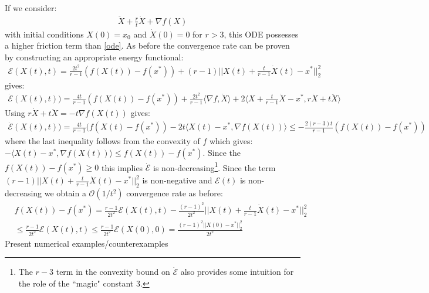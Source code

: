 \documentclass{article}
\begin{document}
If we consider:
\begin{align}
    \ddot{X} + \frac{r}{t} \dot{X} + \nabla f(X) \label{highfrictionode}
\end{align}
with initial conditions $X(0) = x_0$ and $\dot{X}(0) = 0$ for $r>3$, this ODE possesses a higher friction term than \eqref{ode}. As before the convergence rate can be proven by constructing an appropriate energy functional:
\begin{align*}
    \mathcal{E}(X(t), t) = \frac{2t^2}{r-1} \left( f(X(t)) -f(x^*) \right) + (r-1) ||X(t) + \frac{t}{r-1}\dot{X}(t) -x^*||_2^2
\end{align*}
gives:
\begin{align*}
    \dot{\mathcal{E}}(X(t), t)) = \frac{4t}{r-1}(f(X(t)) - f(x^*)) + \frac{2t^2}{r-1} \langle \nabla f, \dot{X} \rangle + 2 \langle X + \frac{t}{r-1} \dot{X} - x^*, r \dot{X} + t \ddot{X} \rangle
\end{align*}
Using $r\dot{X} + t \ddot{X} = -t \nabla f(X(t))$ gives:
\begin{align*}
    \dot{\mathcal{E}}(X(t), t)) = \frac{4t}{r-1} (f(X(t) - f(x^*)) - 2t \langle X(t) - x^*, \nabla f(X(t)) \rangle \leq - \frac{2(r-3)t}{r-1}(f(X(t))-f(x^*))
\end{align*}
where the last inequality follows from the convexity of $f$ which gives: $-\langle X(t) - x^*, \nabla f(X(t)) \rangle \leq f(X(t)) - f(x^*)$. Since the $f(X(t)) - f(x^*) \geq 0$ this implies $\dot{\mathcal{E}}$ is non-decreasing\footnote{The $r-3$ term in the convexity bound on $\dot{\mathcal{E}}$ also provides some intuition for the role of the ``magic" constant $3$.}. Since the term $(r-1) ||X(t) + \frac{t}{r-1} \dot{X}(t) - x^*||_2^2$ is non-negative and $\mathcal{E}(t)$ is non-decreasing we obtain a $\mathcal{O}(1/t^2)$ convergence rate as before:
\begin{align*}
    & f(X(t)) - f(x^*) = \frac{r-1}{2t^2} \mathcal{E}(X(t), t) - \frac{(r-1)^2}{2t^2} ||X(t) + \frac{t}{r-1} \dot{X}(t) - x^*||_2^2 \\
    & \leq \frac{r-1}{2t^2} \mathcal{E}(X(t), t) \leq \frac{r-1}{2t^2} \mathcal{E}(X(0), 0) = \frac{(r-1)^2 ||X(0)-x^*||_2^2}{2 t^2}
\end{align*}
Present numerical examples/counterexamples
 
\end{document}
